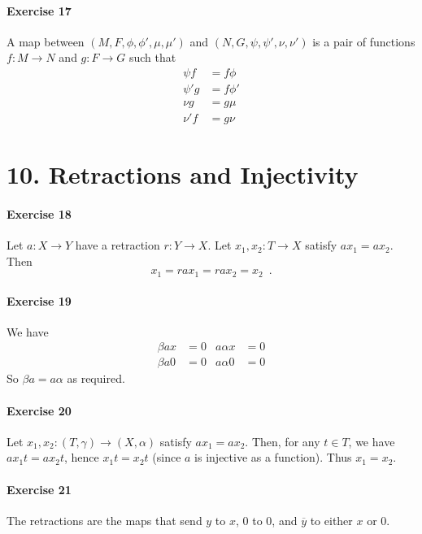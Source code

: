 \documentclass{report}
\begin{document}
    \paragraph{Exercise 17}
    A map between $(M, F, \phi, \phi', \mu, \mu')$ and $(N, G, \psi, \psi', \nu, \nu')$
    is a pair of functions $f : M \rightarrow N$ and $g : F \rightarrow G$ such that
    \begin{align*}
        \psi f & = f \phi \\
        \psi' g & = f \phi' \\
        \nu g & = g \mu \\
        \nu' f & = g \nu
    \end{align*}

    \section{10. Retractions and Injectivity}

    \paragraph{Exercise 18}
    Let $a : X \rightarrow Y$ have a retraction $r : Y \rightarrow X$. Let $x_1, x_2 : T \rightarrow X$
    satisfy $a x_1 = a x_2$. Then
    \[ x_1 = r a x_1 = r a x_2 = x_2 \enspace . \]

    \paragraph{Exercise 19}
    We have
    \begin{align*}
        \beta a x & = 0 & a \alpha x & = 0 \\
        \beta a 0 & = 0 & a \alpha 0 & = 0
    \end{align*}
    So $\beta a = a \alpha$ as required.

    \paragraph{Exercise 20}
    Let $x_1, x_2 : (T, \gamma) \rightarrow (X, \alpha)$ satisfy $a x_1 = a x_2$. Then, for any $t \in T$,
    we have $a x_1 t = a x_2 t$, hence $x_1 t = x_2 t$ (since $a$ is injective as a function). Thus $x_1 = x_2$.

    \paragraph{Exercise 21}
    The retractions are the maps that send $y$ to $x$, $0$ to $0$, and $\overline{y}$ to either $x$ or $0$.
\end{document}
